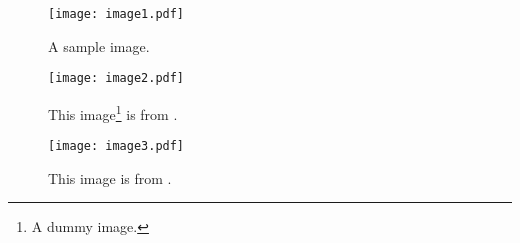 \documentclass[
aps,
prl,
groupedaddress,
superscriptaddress,
floatfix,
notitlepage
]{revtex4-1}
\begin{document}
\begin{figure}
	\centerfloat
	\begin{minipage}{1.4\linewidth}
		\texttt{[image: image1.pdf]}
		\caption{A sample image.}
	\end{minipage}
\end{figure}

\begin{figure}
	\centerfloat
	\begin{minipage}{1.4\linewidth}
		\texttt{[image: image2.pdf]}
		\caption{This image\footnote{A dummy image.} is from \cite{Lu-2014}.}
			\label{fig:image2}
	\end{minipage}
\end{figure}

\begin{figure}
	\centerfloat
	\begin{minipage}{1.4\linewidth}
		\texttt{[image: image3.pdf]}
		\caption{This image is from \cite{Lu-2014}.}
			\label{fig:image3}
	\end{minipage}
\end{figure}

%
\end{document}
